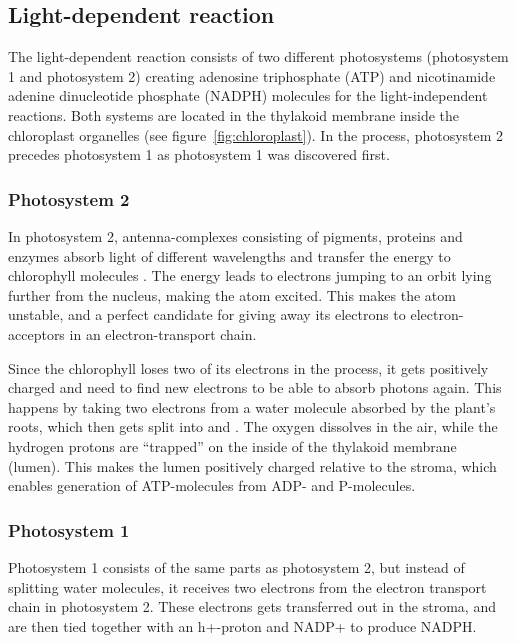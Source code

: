 \subsection{Light-dependent reaction}
The light-dependent reaction consists of two different photosystems (photosystem 1 and photosystem 2) creating adenosine triphosphate (ATP) and nicotinamide adenine dinucleotide phosphate (NADPH) molecules for the light-independent reactions. Both systems are located in the thylakoid membrane inside the chloroplast organelles (see figure~\ref{fig:chloroplast}). In the process, photosystem 2 precedes photosystem 1 as photosystem 1 was discovered first. 

\subsubsection{Photosystem 2}
In photosystem 2, antenna-complexes consisting of pigments, proteins and enzymes absorb light of different wavelengths and transfer the energy to chlorophyll molecules \citep{bios}. The energy leads to electrons jumping to an orbit lying further from the nucleus, making the atom excited. This makes the atom unstable, and a perfect candidate for giving away its electrons to electron-acceptors in an electron-transport chain.

Since the chlorophyll loses two of its electrons in the process, it gets positively charged and need to find new electrons to be able to absorb photons again. This happens by taking two electrons from a water molecule absorbed by the plant's roots, which then gets split into  and  \citep{bios}. The oxygen dissolves in the air, while the hydrogen protons are “trapped” on the inside of the thylakoid membrane (lumen). This makes the lumen positively charged relative to the stroma, which enables generation of ATP-molecules from ADP- and P-molecules. 

\subsubsection{Photosystem 1}
Photosystem 1 consists of the same parts as photosystem 2, but instead of splitting water molecules, it receives two electrons from the electron transport chain in photosystem 2. These electrons gets transferred out in the stroma, and are then tied together with an h+-proton and NADP+ to produce NADPH.

